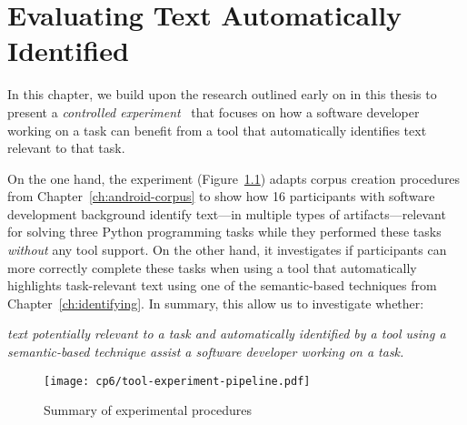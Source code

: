 \setcounter{chapter}{5}
\setcounter{rq}{1}


\chapter{Evaluating Text Automatically Identified}
\label{ch:assisting}




In this chapter, we build upon the research outlined  early on in this thesis to
present a \textit{controlled experiment}~\cite{Lazar2017-cp2} that focuses on how  a
software developer working on a task can benefit from a tool that automatically identifies text 
relevant to that task.



On the one hand, 
the experiment (Figure~\ref{fig:tool-experiment-procedures})
adapts corpus creation procedures from Chapter~\ref{ch:android-corpus}
to show how 16 participants with software development background identify 
text---in multiple types of artifacts---relevant for solving three Python programming tasks while they performed these tasks \textit{without} any tool support. 
On the other hand, 
it investigates if participants can more correctly complete these tasks 
when using a tool 
that  automatically highlights 
task-relevant text using one of the semantic-based techniques 
from Chapter~\ref{ch:identifying}. 
In summary, this allow us to investigate whether:

\medskip
\begin{bluequote}
    \textit{text potentially relevant to a task and automatically identified  by a tool using a semantic-based technique assist a software developer working on a task.}
\end{bluequote}



\begin{figure}
    \centering
    \texttt{[image: cp6/tool-experiment-pipeline.pdf]}
    \caption{Summary of experimental procedures}
    \label{fig:tool-experiment-procedures}
\end{figure}




